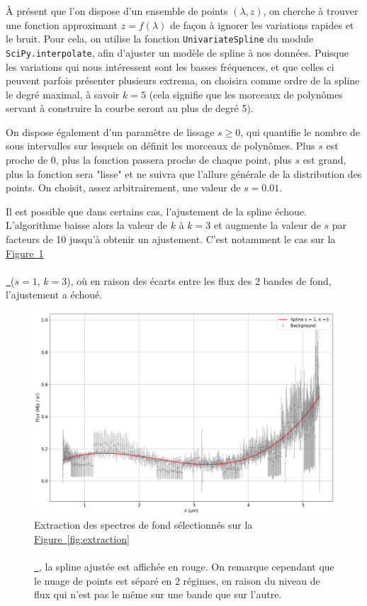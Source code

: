 \documentclass[12pt, a4paper]{article}
\newcommand*{\figref}[2][]{%
  \hyperref[{#2}]{%
    Figure~\ref*{#2}%
    \ifx\\#1\\%
    \else
      \,#1%
    \fi
  }%
}
\begin{document}
À présent que l'on dispose d'un ensemble de points $(\lambda, z)$, on cherche à trouver une fonction approximant $z = f(\lambda)$ de façon à ignorer les variations rapides et le bruit. Pour cela, on utilise la fonction \texttt{UnivariateSpline} du module \texttt{SciPy.interpolate}, afin d'ajuster un modèle de spline à nos données. Puisque les variations qui nous intéressent sont les basses fréquences, et que celles ci peuvent parfois présenter plusieurs extrema, on choisira comme ordre de la spline le degré maximal, à savoir $k=5$ (cela signifie que les morceaux de polynômes servant à construire la courbe seront au plus de degré 5). 

On dispose également d'un paramètre de lissage $s \geq 0$, qui quantifie le nombre de sous intervalles sur lesquels on définit les morceaux de polynômes. Plus $s$ est proche de 0, plus la fonction passera proche de chaque point, plus $s$ est grand, plus la fonction sera "lisse" et ne suivra que l'allure générale de la distribution des points. On choisit, assez arbitrairement, une valeur de $s=0.01$.

Il est possible que dans certains cas, l'ajustement de la spline échoue. L'algorithme baisse alors la valeur de $k$ à $k=3$ et augmente la valeur de $s$ par facteurs de 10 jusqu'à obtenir un ajustement. C'est notamment le cas sur la \figref{fig:spline_fit} ($s=1$, $k=3$), où en raison des écarts entre les flux des 2 bandes de fond, l'ajustement a échoué.

\begin{figure}[!h]
  \centering
  \includegraphics[scale=0.45]{assets/fit_spline.png}
  \caption{Extraction des spectres de fond sélectionnés sur la \figref{fig:extraction}, la spline ajustée est affichée en rouge. On remarque cependant que le nuage de points est séparé en 2 régimes, en raison du niveau de flux qui n'est pas le même sur une bande que sur l'autre.}
  \label{fig:spline_fit}
\end{figure}
\end{document}
